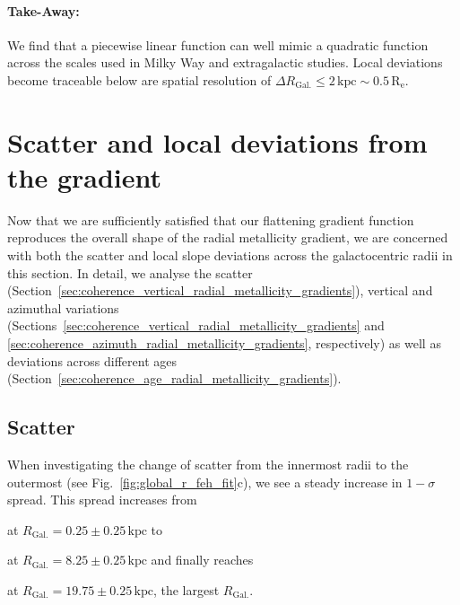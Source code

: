 \documentclass[fleqn,usenatbib]{mnras}
\begin{document}
\paragraph*{Take-Away:} We find that a piecewise linear function can well mimic a quadratic function across the scales used in Milky Way and extragalactic studies. Local deviations become traceable below are spatial resolution of $\Delta R_\mathrm{Gal.} \leq 2\,\mathrm{kpc} \sim 0.5\,\mathrm{R_e}$.

\section{Scatter and local deviations from the gradient}
\label{sec:scatter_radial_metallicity_gradients}

Now that we are sufficiently satisfied that our flattening gradient function reproduces the overall shape of the radial metallicity gradient, we are concerned with both the scatter and local slope deviations across the galactocentric radii in this section. In detail, we analyse the scatter (Section~\ref{sec:coherence_vertical_radial_metallicity_gradients}), vertical and azimuthal variations (Sections~\ref{sec:coherence_vertical_radial_metallicity_gradients} and \ref{sec:coherence_azimuth_radial_metallicity_gradients}, respectively) as well as deviations across different ages (Section~\ref{sec:coherence_age_radial_metallicity_gradients}).

\subsection{Scatter}
\label{sec:scatter}

When investigating the change of scatter from the innermost radii to the outermost (see Fig.~\ref{fig:global_r_feh_fit}c), we see a steady increase in $1-\sigma$ spread. This spread increases from
\begin{description}
    \item  at $R_\mathrm{Gal.} = 0.25 \pm 0.25\,\mathrm{kpc}$ to
    \item  at $R_\mathrm{Gal.} = 8.25 \pm 0.25\,\mathrm{kpc}$ and finally reaches 
     \item  at $R_\mathrm{Gal.} = 19.75 \pm 0.25\,\mathrm{kpc}$, the largest $R_\mathrm{Gal.}$.
\end{description}
\end{document}
